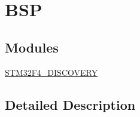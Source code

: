 \hypertarget{group__BSP}{\section{B\-S\-P}
\label{group__BSP}
}
\subsection*{Modules}
\begin{DoxyCompactItemize}
\item 
\hyperlink{group__STM32F4__DISCOVERY}{S\-T\-M32\-F4\-\_\-\-D\-I\-S\-C\-O\-V\-E\-R\-Y}
\end{DoxyCompactItemize}


\subsection{Detailed Description}
